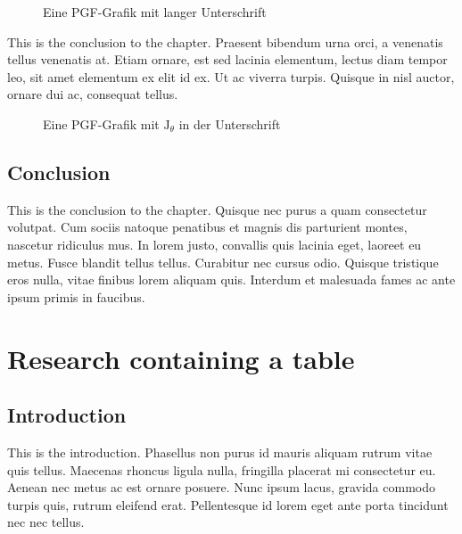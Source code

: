 \begin{figure}[htp]
\hypertarget{ref_a_pgf_figure}{%
\centering

\caption[Eine PGF-Grafik]{Eine PGF-Grafik mit langer Unterschrift}\label{ref_a_pgf_figure}
}
\end{figure}
This is the conclusion to the chapter. Praesent bibendum urna orci,
a venenatis tellus venenatis at. Etiam ornare, est sed lacinia
elementum, lectus diam tempor leo, sit amet elementum ex elit id ex.
Ut ac viverra turpis. Quisque in nisl auctor, ornare dui ac,
consequat tellus.

\begin{figure}[]
\hypertarget{ref_a_mathy_pgf_figure}{%
\centering

\caption[Eine PGF-Grafik mit \(\mathrm{J}_\theta\)]{Eine PGF-Grafik mit \(\mathrm{J}_\theta\) in der Unterschrift}\label{ref_a_mathy_pgf_figure}
}
\end{figure}

\hypertarget{conclusion-1}{%
\subsection{Conclusion}\label{conclusion-1}}

This is the conclusion to the chapter. Quisque nec purus a quam
consectetur volutpat. Cum sociis natoque penatibus et magnis dis
parturient montes, nascetur ridiculus mus. In lorem justo, convallis
quis lacinia eget, laoreet eu metus. Fusce blandit tellus tellus.
Curabitur nec cursus odio. Quisque tristique eros nulla, vitae
finibus lorem aliquam quis. Interdum et malesuada fames ac ante
ipsum primis in faucibus.

\hypertarget{research-containing-a-table}{%
\section{Research containing a
table}\label{research-containing-a-table}}

\hypertarget{introduction-2}{%
\subsection{Introduction}\label{introduction-2}}

This is the introduction. Phasellus non purus id mauris aliquam
rutrum vitae quis tellus. Maecenas rhoncus ligula nulla, fringilla
placerat mi consectetur eu. Aenean nec metus ac est ornare posuere.
Nunc ipsum lacus, gravida commodo turpis quis, rutrum eleifend erat.
Pellentesque id lorem eget ante porta tincidunt nec nec tellus.

